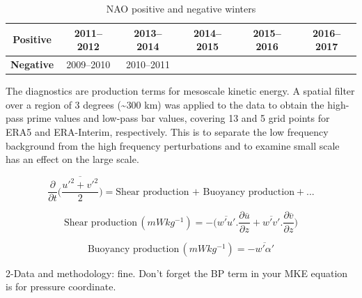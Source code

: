 
  \begin{table}
  \caption{NAO positive and negative winters} \label{t_NAO}
  \centering
  \begin{tabular}{c c c c c c}
  \hline
  \textbf{Positive} & 2011--2012 & 2013--2014 & 2014--2015 & 2015--2016 & 2016--2017 \\
  \hline
  \textbf{Negative}  & 2009--2010  & 2010--2011 &  &  &  \\
  \hline
  \end{tabular}
  \end{table}



The diagnostics are production terms for mesoscale kinetic energy. A spatial filter over a region of 3 degrees (\textasciitilde{300} km) was applied to the data to obtain the high-pass prime values and low-pass bar values, covering 13 and 5 grid points for ERA5 and ERA-Interim, respectively. This is to separate the low frequency background from the high frequency perturbations and to examine small scale has an effect on the large scale. 

\begin{equation} \label{eq_diag1}
\frac{\partial}{\partial{t}} \Bigg(\frac{\overline{u'^2 + v'^2}}{2}\Bigg) = \text{Shear production + Buoyancy production} + ... 
\end{equation}

\begin{equation} \label{eq_diag2}
\text{Shear production} \,(mWkg^{-1}) = -\Bigg({\overline{w'u'} . \frac{\partial{\overline u}}{\partial z} + \overline{w'v'} . \frac{\partial{\overline v}}{\partial z}}\Bigg)
\end{equation}

\begin{equation} \label{eq_diag3}
\text{Buoyancy production} \,(mWkg^{-1}) = {-\overline{w'\alpha'}}
\end{equation}

2-Data and methodology: fine. Don’t forget the BP term in your MKE equation is for pressure coordinate.


